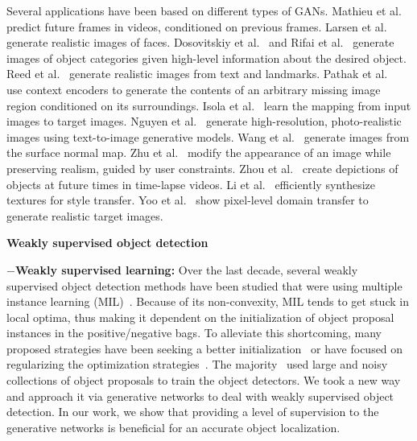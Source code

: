 \documentclass[runningheads]{llncs}
\begin{document}
Several applications have been based on different types of GANs. Mathieu et al.~\cite{mathieu} predict future frames in videos, conditioned on previous frames. Larsen et al.~\cite{larsen} generate realistic images of faces. Dosovitskiy et al.~\cite{dosovitskiy} and Rifai et al.~\cite{rifai} generate images of object categories given high-level information about the desired object. Reed et al.~\cite{reed2} generate realistic images from text and landmarks. Pathak et al.~\cite{pathak} use context encoders to generate the contents of an arbitrary missing image region conditioned on its surroundings. Isola et al.~\cite{isola} learn the mapping from input images to target images. Nguyen et al.~\cite{nguyen} generate high-resolution, photo-realistic images using text-to-image generative models. Wang et al.~\cite{cite39} generate images from the surface normal map. Zhu et al.~\cite{cite49} modify the appearance of an image while preserving realism, guided by user constraints. Zhou et al.~\cite{cite48}  create depictions of objects at future times in time-lapse videos. Li et al.~\cite{cite25} efficiently synthesize textures for style transfer. Yoo et al.~\cite{cite43} show pixel-level domain transfer to generate realistic target images. 



\textbf{Weakly supervised object detection}

$-$\textbf{Weakly supervised learning:} Over the last decade, several weakly supervised object detection methods have been studied that were using multiple instance learning (MIL)~\cite{bilen14,bilen15,siva,song14}. Because of its non-convexity, MIL tends to get stuck in local optima, thus making it dependent on the initialization of object proposal instances in the positive/negative bags. To alleviate this shortcoming, many proposed strategies have been seeking a better initialization~\cite{does10,Siva12,siva,song14a} or have focused on regularizing the optimization strategies~\cite{bilen14,bilen15,cinbis}. The majority~\cite{reed14,sukh14} used large and noisy collections of object proposals to train the object detectors. We took a new way and approach it via generative networks to deal with weakly supervised object detection. In our work, we show that providing a level of supervision to the generative networks is beneficial for an accurate object localization. 

\iffalse
$-$\textbf{Object proposal generation:}  Nguyen et al.~\cite{nguyen} and Pandey et al.~\cite{Pandey} extract densely sampled regions from an image using an initial bounding box.  Since, these methods were not able to generate enough proposals because of fixed aspect-ratio, size, and shape, approaches based on object saliency~\cite{does10,Siva12,siva} were proposed to extract region proposals. Currently, the most popular methods are based on (i) image saliency and objectness measures~\cite{alex10}, (ii) edge boxes using structural edges~\cite{zitnick2014edge}, (iii) segmentation-based algorithms like Selective search~\cite{SS} and Multiscale Combinatorial Grouping~\cite{arbelaez2014multiscale},  (iv) the geodesic distance transform~\cite{krahenbuhl2014geodesic},  (v) CNN based object proposals using Deep proposal ~\cite{ghodrati} and Region Proposal Networks~\cite{ren}.
\fi
\end{document}
